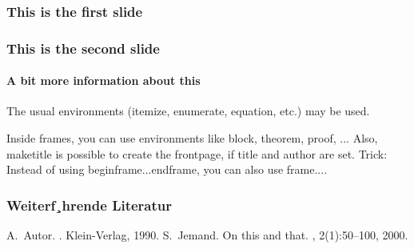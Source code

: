 \documentclass[xetex,aspectratio=169]{mybeamer}
\begin{document}
  \begin{frame}
    \frametitle{This is the first slide}
  \end{frame}
  \begin{frame}
    \frametitle{This is the second slide}
    \framesubtitle{A bit more information about this}
  \end{frame}
  
  \begin{frame}
  The usual environments (itemize, enumerate, equation, etc.) may be used.
  
  Inside frames, you can use environments like block, theorem, proof, ... Also, maketitle is possible to create the frontpage, if title and author are set.
  Trick: Instead of using begin{frame}...end{frame}, you can also use frame{...}.
  
  \end{frame}



\begin{frame}[allowframebreaks]
  \frametitle<presentation>{Weiterf¸hrende Literatur}    
  \begin{thebibliography}{10}    
  \beamertemplatebookbibitems
    A.~Autor.
    .
    \newblock Klein-Verlag, 1990.
  \beamertemplatearticlebibitems
    S.~Jemand.
    \newblock On this and that.
    , 2(1):50--100, 2000.
  \end{thebibliography}
\end{frame}
\end{document}
